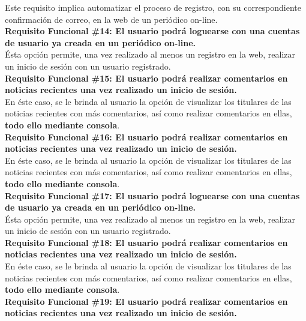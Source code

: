 \begin{adjustwidth}{0.5cm}{}
	Este requisito implica automatizar el proceso de registro, con su correspondiente confirmación de correo, en la web de un periódico on-line. \\
	\linebreak
	\textbf{Requisito Funcional \#14: El usuario podrá loguearse con una cuentas de usuario ya creada en un periódico on-line.}\\
	Ésta opción permite, una vez realizado al menos un registro en la web, realizar un inicio de sesión con un usuario registrado. \\
	\linebreak				
	\textbf{Requisito Funcional \#15: El usuario podrá realizar comentarios en noticias recientes una vez realizado un inicio de sesión.}\\
	En éste caso, se le brinda al usuario la opción de visualizar los titulares de las noticias recientes con más comentarios, así como realizar comentarios en ellas, \textbf{todo ello mediante consola}. \\
	\linebreak			
	\textbf{Requisito Funcional \#16: El usuario podrá realizar comentarios en noticias recientes una vez realizado un inicio de sesión.}\\
	En éste caso, se le brinda al usuario la opción de visualizar los titulares de las noticias recientes con más comentarios, así como realizar comentarios en ellas, \textbf{todo ello mediante consola}. \\
	\linebreak	
	\textbf{Requisito Funcional \#17: El usuario podrá loguearse con una cuentas de usuario ya creada en un periódico on-line.}\\
	Ésta opción permite, una vez realizado al menos un registro en la web, realizar un inicio de sesión con un usuario registrado. \\
	\linebreak				
	\textbf{Requisito Funcional \#18: El usuario podrá realizar comentarios en noticias recientes una vez realizado un inicio de sesión.}\\
	En éste caso, se le brinda al usuario la opción de visualizar los titulares de las noticias recientes con más comentarios, así como realizar comentarios en ellas, \textbf{todo ello mediante consola}. \\
	\linebreak			
	\textbf{Requisito Funcional \#19: El usuario podrá realizar comentarios en noticias recientes una vez realizado un inicio de sesión.}\\

\end{adjustwidth}
